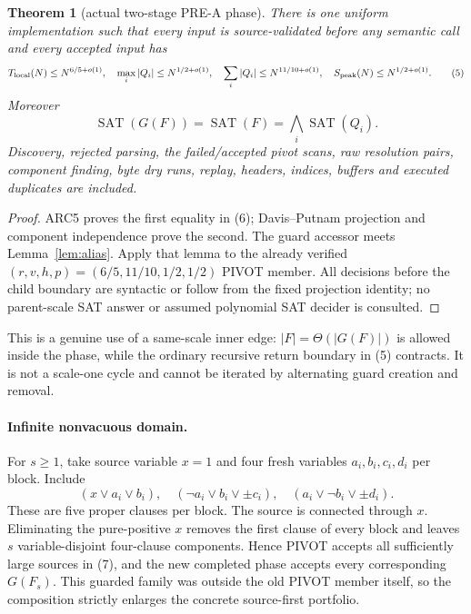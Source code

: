 \documentclass[11pt]{article}
\newtheorem{theorem}{Theorem}
\newcommand{\SAT}{\operatorname{SAT}}
\begin{document}
\begin{theorem}[actual two-stage PRE-A phase]\label{thm:phase}
There is one uniform implementation such that every input is source-validated
before any semantic call and every accepted input has
\begin{equation}
 T_{\rm local}(N)\le N^{6/5+o(1)},\quad
 \max_i|Q_i|\le N^{1/2+o(1)},\quad
 \sum_i|Q_i|\le N^{11/10+o(1)},\quad
 S_{\rm peak}(N)\le N^{1/2+o(1)}.                         \tag{5}
\end{equation}
Moreover
\begin{equation}
 \SAT(G(F))=\SAT(F)=\bigwedge_i\SAT(Q_i).                 \tag{6}
\end{equation}
Discovery, rejected parsing, the failed/accepted pivot scans, raw resolution
pairs, component finding, byte dry runs, replay, headers, indices, buffers
and executed duplicates are included.
\end{theorem}
\begin{proof}
ARC5 proves the first equality in (6); Davis--Putnam projection and component
independence prove the second.  The guard accessor meets Lemma~\ref{lem:alias}.
Apply that lemma to the already verified
$(r,v,h,p)=(6/5,11/10,1/2,1/2)$ PIVOT member.  All decisions before the child
boundary are syntactic or follow from the fixed projection identity; no
parent-scale SAT answer or assumed polynomial SAT decider is consulted.
\end{proof}

This is a genuine use of a same-scale inner edge: $|F|=\Theta(|G(F)|)$ is
allowed inside the phase, while the ordinary recursive return boundary in
(5) contracts.  It is not a scale-one cycle and cannot be iterated by
alternating guard creation and removal.

\paragraph{Infinite nonvacuous domain.}
For $s\ge1$, take source variable $x=1$ and four fresh variables
$a_i,b_i,c_i,d_i$ per block.  Include
\begin{equation}
 (x\vee a_i\vee b_i),\quad
 (\neg a_i\vee b_i\vee\pm c_i),\quad
 (a_i\vee\neg b_i\vee\pm d_i).                           \tag{7}
\end{equation}
These are five proper clauses per block.  The source is connected through
$x$.  Eliminating the pure-positive $x$ removes the first clause of every
block and leaves $s$ variable-disjoint four-clause components.  Hence
PIVOT accepts all sufficiently large sources in (7), and the new completed
phase accepts every corresponding $G(F_s)$.  This guarded family was outside
the old PIVOT member itself, so the composition strictly enlarges the
concrete source-first portfolio.
\end{document}
